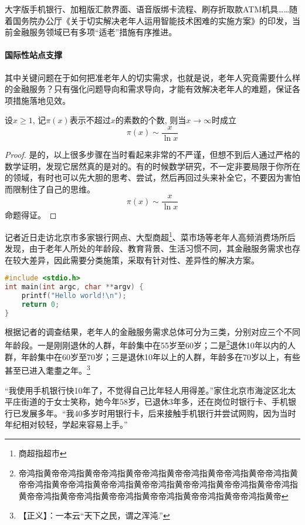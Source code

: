 \documentclass{ecnuthesis}
\begin{document}
大字版手机银行、加粗版汇款界面、语音版绑卡流程、刷存折取款ATM机具……随着国务院办公厅《关于切实解决老年人运用智能技术困难的实施方案》的印发，当前金融服务领域已有多项“适老”措施有序推进。

\paragraph{国际性站点支撑}

其中关键问题在于如何把准老年人的切实需求，也就是说，老年人究竟需要什么样的金融服务？只有强化问题导向和需求导向，才能有效解决老年人的难题，保证各项措施落地见效。

\begin{theorem}[素数定理]
  设$x \geqslant 1$, 记$\pi(x)$表示不超过$x$的素数的个数, 则当$x \to \infty$时成立
  \[\pi(x) \sim \frac{x}{\ln x}\]
\end{theorem}

\begin{proof}
  是的，以上很多步骤在当时看起来非常的不严谨，但想不到后人通过严格的数学证明，发现它居然真的是对的。有的时候数学研究，不一定非要局限于你所在的领域，有时也可以先大胆的思考、尝试，然后再回过头来补全它，不要因为害怕而限制住了自己的思维。
  \[\pi(x) \sim \frac{x}{\ln x}\]
  命题得证。
\end{proof}

记者近日走访北京市多家银行网点、大型商超\footnote{商超指超市}、菜市场等老年人高频消费场所后发现，由于老年人所处的年龄段、教育背景、生活习惯不同，其金融服务需求也存在较大差异，因此需要分类施策，采取有针对性、差异性的解决方案。

\begin{lstlisting}[language=C++]
#include <stdio.h>
int main(int argc, char **argv) {
    printf("Hello world!\n");
    return 0;
}
\end{lstlisting}

根据记者的调查结果，老年人的金融服务需求总体可分为三类，分别对应三个不同年龄段。一是刚刚退休的人群，年龄集中在55岁至60岁；二是\footnote{帝鸿指黄帝帝鸿指黄帝帝鸿指黄帝帝鸿指黄帝帝鸿指黄帝帝鸿指黄帝帝鸿指黄帝帝鸿指黄帝帝鸿指黄帝帝鸿指黄帝帝鸿指黄帝帝鸿指黄帝帝鸿指黄帝帝鸿指黄帝帝鸿指黄帝帝鸿指黄帝帝鸿指黄帝帝鸿指黄帝帝鸿指黄帝帝鸿指黄帝}退休10年以内的人群，年龄集中在60岁至70岁；三是退休10年以上的人群，年龄多在70岁以上，有些甚至已进入耄耋之年。\footnote{【正义】：一本云“天下之民，谓之浑沌.”}

“我使用手机银行快10年了，不觉得自己比年轻人用得差。”家住北京市海淀区北太平庄街道的于女士笑称，她今年58岁，已退休3年多，还在岗位时银行卡、手机银行已发展多年。“我40多岁时用银行卡，后来接触手机银行并尝试网购，因为当时年纪相对较轻，学起来容易上手。”
\end{document}
